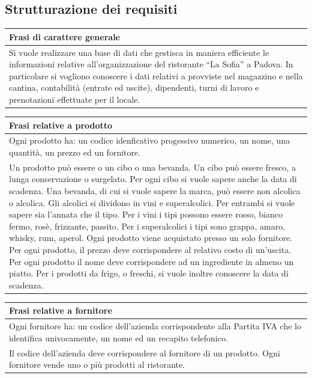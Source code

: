 \subsection{Strutturazione dei requisiti} 
\begin{longtable}{|p{15.5cm}|}
    \hline
    \textbf{Frasi di carattere generale} \\ \hline
    Si vuole realizzare una base di dati che gestisca in maniera efficiente le informazioni relative all’organizzazione del ristorante “La Sofia” a Padova. In particolare si vogliono conoscere i dati relativi a provviste nel magazzino e nella cantina, contabilità (entrate ed uscite), dipendenti, turni di lavoro e prenotazioni effettuate per il locale. \\ \hline
\end{longtable}

\begin{longtable}{|p{15.5cm}|}
    \hline
    \textbf{Frasi relative a prodotto} \\ \hline
    Ogni prodotto ha: un codice idenficativo progessivo numerico, un nome, una quantità, un prezzo ed un fornitore.\\
    Un prodotto può essere o un cibo o una bevanda.
    Un cibo può essere fresco, a lunga conservazione o surgelato. Per ogni cibo si vuole
    sapere anche la data di scadenza.
    Una bevanda, di cui si vuole sapere la marca, può essere non alcolica o alcolica. Gli
    alcolici si dividono in vini e superalcolici. Per entrambi si vuole sapere sia l’annata che
    il tipo.
    Per i vini i tipi possono essere rosso, bianco fermo, rosè, frizzante, passito. Per i
    superalcolici i tipi sono grappa, amaro, whisky, rum, aperol.
    Ogni prodotto viene acquistato presso un solo fornitore.
    Per ogni prodotto, il prezzo deve corrispondere al relativo costo di un’uscita.
    Per ogni prodotto il nome deve corrispondere ad un ingrediente in almeno un piatto.
    Per i prodotti da frigo, o freschi, si vuole inoltre conoscere la data di scadenza.\\ \hline
\end{longtable}

\begin{longtable}{|p{15.5cm}|}
    \hline
    \textbf{Frasi relative a fornitore} \\ \hline
    Ogni fornitore ha: un codice dell'azienda corrispondente alla Partita IVA che lo identifica univocamente, un nome ed un recapito telefonico.\\
    Il codice dell’azienda deve corrispondere al fornitore di un prodotto.
    Ogni fornitore vende uno o più prodotti al ristorante.
    \\ \hline
\end{longtable}

